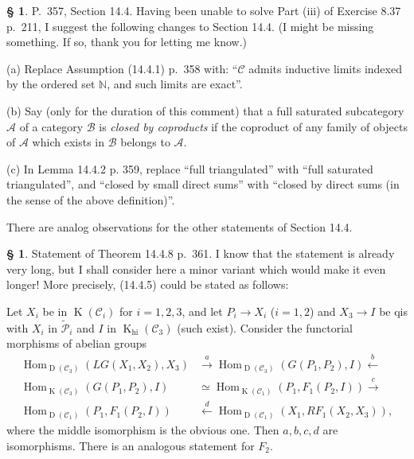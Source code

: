 \documentclass[12pt]{article}%
\theoremstyle{remark}
\theoremstyle{definition}
\newtheorem{s}[thm]{\S}%
\newcommand{\nn}{\noindent}
\newcommand{\mc}{\mathcal}
\newcommand{\bb}{\mathbb}
\newcommand{\oo}{\operatorname}
\newcommand{\A}{\mathcal A}
\newcommand{\B}{\mathcal B}
\newcommand{\C}{\mathcal C}
\newcommand{\xr}{\xrightarrow}
\DeclareMathOperator{\Hom}{Hom}%
\begin{document}
%

\begin{s}%
P.~357, Section 14.4. Having been unable to solve Part (iii) of Exercise 8.37 p.~211, I suggest the following changes to Section 14.4. (I might be missing something. If so, thank you for letting me know.)

\nn(a) Replace Assumption (14.4.1) p.~358 with: ``$\C$ admits inductive limits indexed by the ordered set $\bb N$, and such limits are exact''.

\nn(b) Say (only for the duration of this comment) that a full saturated subcategory $\A$ of a category $\B$ is {\em closed by coproducts} if the coproduct of any family of objects of $\A$ which exists in $\B$ belongs to $\A$.

\nn(c) In Lemma 14.4.2 p. 359, replace ``full triangulated'' with ``full saturated triangulated'', and ``closed by small direct sums'' with ``closed by direct sums (in the sense of the above definition)''. 

There are analog observations for the other statements of Section 14.4.
\end{s}

%

\begin{s}%
Statement of Theorem 14.4.8 p.~361. I know that the statement is already very long, but I shall consider here a minor variant which would make it even longer! More precisely, (14.4.5) could be stated as follows:

Let $X_i$ be in $\oo K(\C_i)$ for $i=1,2,3$, and let $P_i\to X_i$ ($i=1,2$) and $X_3\to I$ be qis with $X_i$ in $\widetilde{\mc P}_i$ and $I$ in $\oo K_{\oo{hi}}(\C_3)$ (such exist). Consider the functorial morphisms of abelian groups
\begin{equation}\label{1448}
\begin{split}
\Hom_{\oo D(\C_3)}(LG(X_1,X_2),X_3)&\xr a\Hom_{\oo D(\C_3)}(G(P_1,P_2),I)\xleftarrow b\\ 
\Hom_{\oo K(\C_3)}(G(P_1,P_2),I)&\simeq\Hom_{\oo K(\C_1)}(P_1,F_1(P_2,I))\xr c\\ 
\Hom_{\oo D(\C_1)}(P_1,F_1(P_2,I))&\xleftarrow d\Hom_{\oo D(\C_1)}(X_1,RF_1(X_2,X_3)),
\end{split}
\end{equation}
where the middle isomorphism is the obvious one. Then $a,b,c,d$ are isomorphisms. There is an analogous statement for $F_2$.
\end{s}

%
\end{document}
